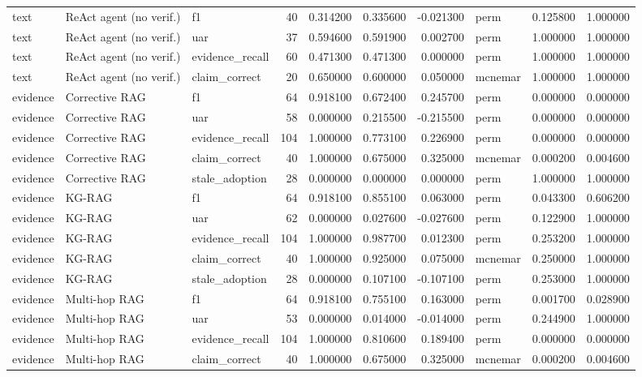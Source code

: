 \begin{table}
\begin{tabular}{lllrrrrlrr}
text & ReAct agent (no verif.) & f1 & 40 & 0.314200 & 0.335600 & -0.021300 & perm & 0.125800 & 1.000000 \\
text & ReAct agent (no verif.) & uar & 37 & 0.594600 & 0.591900 & 0.002700 & perm & 1.000000 & 1.000000 \\
text & ReAct agent (no verif.) & evidence\_recall & 60 & 0.471300 & 0.471300 & 0.000000 & perm & 1.000000 & 1.000000 \\
text & ReAct agent (no verif.) & claim\_correct & 20 & 0.650000 & 0.600000 & 0.050000 & mcnemar & 1.000000 & 1.000000 \\
evidence & Corrective RAG & f1 & 64 & 0.918100 & 0.672400 & 0.245700 & perm & 0.000000 & 0.000000 \\
evidence & Corrective RAG & uar & 58 & 0.000000 & 0.215500 & -0.215500 & perm & 0.000000 & 0.000000 \\
evidence & Corrective RAG & evidence\_recall & 104 & 1.000000 & 0.773100 & 0.226900 & perm & 0.000000 & 0.000000 \\
evidence & Corrective RAG & claim\_correct & 40 & 1.000000 & 0.675000 & 0.325000 & mcnemar & 0.000200 & 0.004600 \\
evidence & Corrective RAG & stale\_adoption & 28 & 0.000000 & 0.000000 & 0.000000 & perm & 1.000000 & 1.000000 \\
evidence & KG-RAG & f1 & 64 & 0.918100 & 0.855100 & 0.063000 & perm & 0.043300 & 0.606200 \\
evidence & KG-RAG & uar & 62 & 0.000000 & 0.027600 & -0.027600 & perm & 0.122900 & 1.000000 \\
evidence & KG-RAG & evidence\_recall & 104 & 1.000000 & 0.987700 & 0.012300 & perm & 0.253200 & 1.000000 \\
evidence & KG-RAG & claim\_correct & 40 & 1.000000 & 0.925000 & 0.075000 & mcnemar & 0.250000 & 1.000000 \\
evidence & KG-RAG & stale\_adoption & 28 & 0.000000 & 0.107100 & -0.107100 & perm & 0.253000 & 1.000000 \\
evidence & Multi-hop RAG & f1 & 64 & 0.918100 & 0.755100 & 0.163000 & perm & 0.001700 & 0.028900 \\
evidence & Multi-hop RAG & uar & 53 & 0.000000 & 0.014000 & -0.014000 & perm & 0.244900 & 1.000000 \\
evidence & Multi-hop RAG & evidence\_recall & 104 & 1.000000 & 0.810600 & 0.189400 & perm & 0.000000 & 0.000000 \\
evidence & Multi-hop RAG & claim\_correct & 40 & 1.000000 & 0.675000 & 0.325000 & mcnemar & 0.000200 & 0.004600 \\

\end{tabular}
\end{table}
